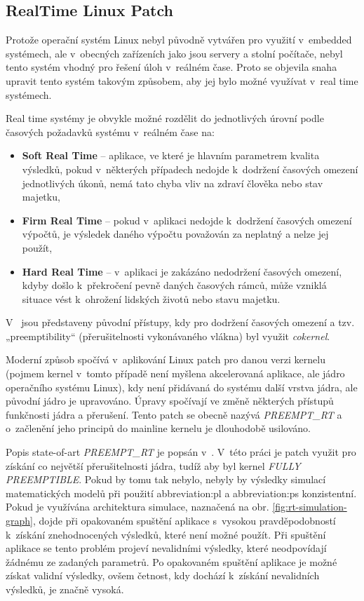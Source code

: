 \documentclass[a4paper, twoside, 11pt]{article}
\begin{document}
		\subsection{RealTime Linux Patch}\label{subsec:real-time-linux-patch}
			Protože operační systém Linux nebyl původně vytvářen pro využití v~embedded systémech, ale v~obecných zařízeních jako jsou servery a stolní počítače, nebyl tento systém vhodný pro řešení úloh v~reálném čase. Proto se objevila snaha upravit tento systém takovým způsobem, aby jej bylo možné využívat v~real time systémech.\par
			Real time systémy je obvykle možné rozdělit do jednotlivých úrovní podle časových požadavků systému v~reálném čase na:
			\begin{itemize}
				\item \textbf{Soft Real Time} – aplikace, ve které je hlavním parametrem kvalita výsledků, pokud v~některých případech nedojde k~dodržení časových omezení jednotlivých úkonů, nemá tato chyba vliv na zdraví člověka nebo stav majetku,
				\item \textbf{Firm Real Time} – pokud v~aplikaci nedojde k~dodržení časových omezení výpočtů, je výsledek daného výpočtu považován za neplatný a nelze jej použít,
				\item \textbf{Hard Real Time} – v~aplikaci je zakázáno nedodržení časových omezení, kdyby došlo k~překročení pevně daných časových rámců, může vzniklá situace vést k~ohrožení lidských životů nebo stavu majetku.
			\end{itemize}
			V~\cite{the-real-time-linux-kernel-survey-on-preempt-rt} jsou představeny původní přístupy, kdy pro dodržení časových omezení a tzv. „preemptibility“ (přerušitelnosti vykonávaného vlákna) byl využit \textit{cokernel}.\par
			Moderní způsob spočívá v~aplikování Linux patch pro danou verzi kernelu (pojmem kernel v~tomto případě není myšlena akcelerovaná aplikace, ale jádro operačního systému Linux), kdy není přidávaná do systému další vrstva jádra, ale původní jádro je upravováno. Úpravy spočívají ve změně některých přístupů funkčnosti jádra a přerušení. Tento patch se obecně nazývá \textit{PREEMPT\_RT} a o~začlenění jeho principů do mainline kernelu je dlouhodobě usilováno. \cite{the-real-time-linux-kernel-survey-on-preempt-rt}\par
			Popis state-of-art \textit{PREEMPT\_RT} je popsán v~\cite{the-real-time-linux-kernel-survey-on-preempt-rt}. V~této práci je patch využit pro získání co největší přerušitelnosti jádra, tudíž aby byl kernel \textit{FULLY PREEMPTIBLE}. Pokud by tomu tak nebylo, nebyly by výsledky simulací matematických modelů při použití \gls{abbreviation:pl} a \gls{abbreviation:ps} konzistentní. Pokud je využívána architektura simulace, naznačená na obr. \ref{fig:rt-simulation-graph}, dojde při opakovaném spuštění aplikace s~vysokou pravděpodobností k~získání znehodnocených výsledků, které není možné použít. Při spuštění aplikace se tento problém projeví nevalidními výsledky, které neodpovídají žádnému ze zadaných parametrů. Po opakovaném spuštění aplikace je možné získat validní výsledky, ovšem četnost, kdy dochází k~získání nevalidních výsledků, je značně vysoká.
\end{document}
